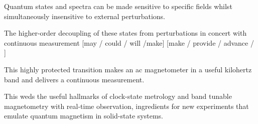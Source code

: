 Quantum states and spectra can be made sensitive to specific fields whilst simultaneously insensitive to external perturbations.

The higher-order decoupling of these states from perturbations in concert with continuous measurement [may / could / will /make] [make / provide / advance / ] 

This highly protected transition makes an ac magnetometer in a useful kilohertz band and delivers a continuous measurement.

This weds the useful hallmarks of clock-state metrology and band tunable magnetometry with real-time observation, ingredients for new experiments that emulate quantum magnetism in solid-state systems.
